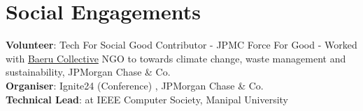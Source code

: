 \section{Social Engagements}
    \begin{itemize}[leftmargin=0.15in, label={}]
    \small{\item{
        \textbf{Volunteer}{:  Tech For Social Good Contributor - JPMC Force For Good - Worked with \href{https://baeru.org/}{Baeru Collective} NGO to towards climate change, waste management and sustainability, JPMorgan Chase \& Co.} \\
        \textbf{Organiser}{: Ignite24 (Conference) , JPMorgan Chase \& Co.} \\
        \textbf{Technical Lead}{: at IEEE Computer Society, Manipal University } \\
    }}
    \end{itemize}